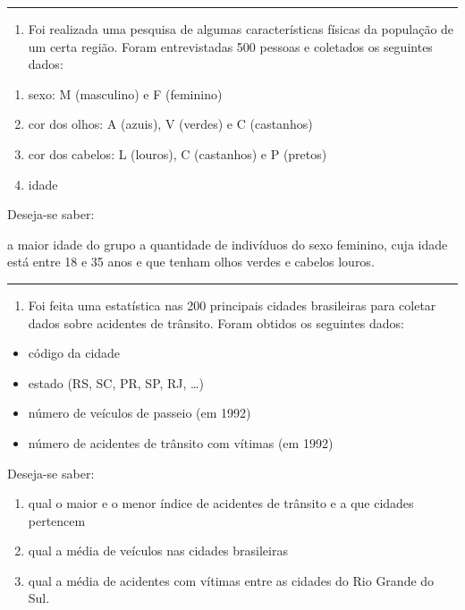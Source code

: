 \documentclass[12pt,a4paper]{article}
\providecommand{\tightlist}{%
      \setlength{\itemsep}{0pt}\setlength{\parskip}{0pt}}
\begin{document}
    \begin{center}\rule{0.5\linewidth}{0.5pt}\end{center}

\begin{enumerate}
\def\labelenumi{\arabic{enumi}.}
\setcounter{enumi}{10}
\tightlist
\item
  Foi realizada uma pesquisa de algumas características físicas da
  população de um certa região. Foram entrevistadas 500 pessoas e
  coletados os seguintes dados:
\end{enumerate}

\begin{enumerate}
\def\labelenumi{\alph{enumi})}
\item
  sexo: M (masculino) e F (feminino)
\item
  cor dos olhos: A (azuis), V (verdes) e C (castanhos)
\item
  cor dos cabelos: L (louros), C (castanhos) e P (pretos)
\item
  idade
\end{enumerate}

Deseja-se saber:

a maior idade do grupo a quantidade de indivíduos do sexo feminino, cuja
idade está entre 18 e 35 anos e que tenham olhos verdes e cabelos
louros.

    \begin{center}\rule{0.5\linewidth}{0.5pt}\end{center}

\begin{enumerate}
\def\labelenumi{\arabic{enumi}.}
\setcounter{enumi}{11}
\tightlist
\item
  Foi feita uma estatística nas 200 principais cidades brasileiras para
  coletar dados sobre acidentes de trânsito. Foram obtidos os seguintes
  dados:
\end{enumerate}

\begin{itemize}
\item
  código da cidade
\item
  estado (RS, SC, PR, SP, RJ, \ldots)
\item
  número de veículos de passeio (em 1992)
\item
  número de acidentes de trânsito com vítimas (em 1992)
\end{itemize}

Deseja-se saber:

\begin{enumerate}
\def\labelenumi{\alph{enumi})}
\item
  qual o maior e o menor índice de acidentes de trânsito e a que cidades
  pertencem
\item
  qual a média de veículos nas cidades brasileiras
\item
  qual a média de acidentes com vítimas entre as cidades do Rio Grande
  do Sul.
\end{enumerate}
\end{document}
